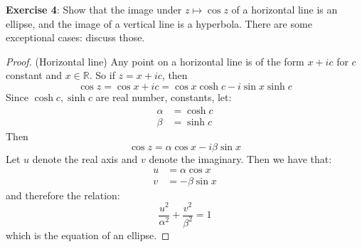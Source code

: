 \documentclass{article}
\begin{document}
\textbf{Exercise 4}: Show that the image under $z \mapsto \cos{z}$ of a horizontal line is an ellipse, and the image of a vertical line is a hyperbola. There are some exceptional cases: discuss those.
    \begin{proof}
        (Horizontal line) Any point on a horizontal line is of the form $x + ic$ for $c$ constant and $x \in \mathbb{R}$. So if $z = x + ic$, then 
            \begin{equation*}
                \cos{z} = \cos{x + ic} = \cos{x}\cosh{c} - i\sin{x}\sinh{c}
            \end{equation*}
        Since $\cosh{c}, \sinh{c}$ are real number, constants, let:
            \begin{align*}
                \alpha &= \cosh{c} \\
                \beta  &= \sinh{c}   
            \end{align*}
        Then 
            \begin{equation*}
                \cos{z} = \alpha\cos{x} - i\beta\sin{x}
            \end{equation*}
        Let $u$ denote the real axis and $v$ denote the imaginary. Then we have that:
            \begin{align*}
                u &= \alpha\cos{x} \\
                v &= -\beta\sin{x}   
            \end{align*}
        and therefore the relation:
            \begin{equation*}
                \dfrac{u^{2}}{\alpha^{2}} + \dfrac{v^{2}}{\beta^{2}} = 1
            \end{equation*}
        which is the equation of an ellipse.


\end{proof}
\end{document}
